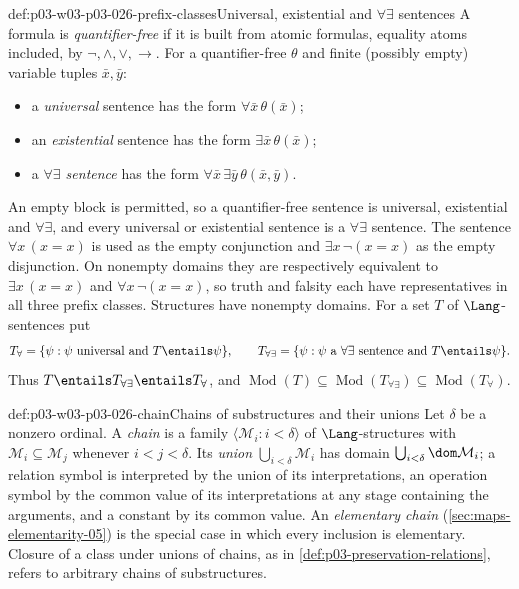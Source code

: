 \begin{hbconvention}{def:p03-w03-p03-026-prefix-classes}{Universal, existential and \(\forall\exists\) sentences}
A formula is \emph{quantifier-free} if it is built from atomic formulas,
equality atoms included, by \(\neg,\land,\lor,\to\).  For a quantifier-free
\(\theta\) and finite (possibly empty) variable tuples \(\bar x,\bar y\):
\begin{itemize}
 \item a \emph{universal} sentence has the form \(\forall\bar x\,\theta(\bar x)\);
 \item an \emph{existential} sentence has the form \(\exists\bar x\,\theta(\bar x)\);
 \item a \emph{\(\forall\exists\) sentence} has the form
       \(\forall\bar x\,\exists\bar y\,\theta(\bar x,\bar y)\).
\end{itemize}
An empty block is permitted, so a quantifier-free sentence is universal,
existential and \(\forall\exists\), and every universal or existential
sentence is a \(\forall\exists\) sentence.  The sentence \(\forall x\,(x=x)\)
is used as the empty conjunction and \(\exists x\,\neg(x=x)\) as the empty
disjunction. On nonempty domains they are respectively equivalent to
\(\exists x\,(x=x)\) and \(\forall x\,\neg(x=x)\), so truth and falsity
each have representatives in all three prefix classes.  Structures have nonempty
domains.  For a set \(T\) of \(\Lang\)-sentences put
\[
 T_{\forall}=\{\psi:\psi\text{ universal and }T\entails\psi\},\qquad
 T_{\forall\exists}=\{\psi:\psi\text{ a }\forall\exists\text{ sentence and }T\entails\psi\}.
\]
Thus \(T\entails T_{\forall\exists}\entails T_{\forall}\), and
\(\operatorname{Mod}(T)\subseteq\operatorname{Mod}(T_{\forall\exists})\subseteq\operatorname{Mod}(T_{\forall})\).
\end{hbconvention}

\begin{hbdefinition}{def:p03-w03-p03-026-chain}{Chains of substructures and their unions}
Let \(\delta\) be a nonzero ordinal.  A \emph{chain} is a family
\(\langle\mathcal M_i:i<\delta\rangle\) of \(\Lang\)-structures with
\(\mathcal M_i\subseteq\mathcal M_j\) whenever \(i<j<\delta\).  Its
\emph{union} \(\bigcup_{i<\delta}\mathcal M_i\) has domain
\(\bigcup_{i<\delta}\dom\mathcal M_i\); a relation symbol is interpreted by
the union of its interpretations, an operation symbol by the common value of
its interpretations at any stage containing the arguments, and a constant by
its common value.  An \emph{elementary chain}
(\cref{sec:maps-elementarity-05}) is the special case in which every
inclusion is elementary.  Closure of a class under unions of chains, as in
\cref{def:p03-preservation-relations}, refers to arbitrary chains of
substructures.
\end{hbdefinition}

